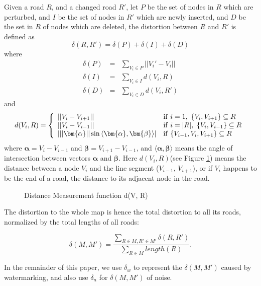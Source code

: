 Given a road $R$, and a changed road $R'$,
let $P$ be the set of nodes in $R$ which are perturbed, and $I$ be the set of
nodes in $R'$ which are newly inserted, and $D$ be the set in $R$ of nodes 
which are deleted, the distortion between $R$ and $R'$ is defined as 
\[\delta(R, R') = \delta(P) + \delta (I) + \delta (D)\]
where
\begin{eqnarray*}
\delta(P) &=& \sum_{V_i \in P} ||V_i' - V_i|| \\ 
\delta(I) &=& \sum_{V_i \in I} d(V_i, R) \\
\delta(D) &=& \sum_{V_i \in D} d(V_i, R')
\end{eqnarray*}
and 
\[
d(V_i, R) = \left\{
\begin{array}{ll}
||V_i - V_{i+1}|| & {\rm if}~ i = 1,~  \{V_i, V_{i+1}\} \subseteq R\\
||V_i - V_{i-1}|| & {\rm if}~ i = |R|,~  \{V_i, V_{i-1}\} \subseteq R\\
|||\bm{\alpha} ||\sin{\langle\bm{\alpha},\bm{\beta}\rangle}| &{\rm if}~ 
				\{V_{i-1}, V_i, V_{i+1}\} \subseteq R
\end{array}
\right. 
\]
where $\bm{\alpha}=V_i - V_{i-1}$ and $\bm{\beta}=V_{i+1}-V_{i-1}$, 
and $\langle\bm{\alpha},\bm{\beta}\rangle$ means the 
angle of intersection between vectors $\bm{\alpha}$ and $\bm{\beta}$. 
Here $d(V_i, R)$(see Figure \ref{fig:dist}) means the distance between a node $V_i$ and the line
segment ($V_{i-1}$, $V_{i+1}$), or if $V_i$ happens to be the end of a road,
the distance to its adjacent node in the road. 

\begin{figure}[h]
\centering
{}
\caption{Distance Measurement function d(V, R)}
\label{fig:dist}
\end{figure}

The distortion to the whole map is hence the total distortion to all its roads,
normalized by the total lengths of all roads:

\[
\label{equ:distort}
\delta(M, M') = \frac{\sum_{R \in M, R' \in M'} \delta(R, R')}{\sum_{R \in M}length(R)}.\] 

In the remainder of this paper, we use $\delta_w$ to represent the $\delta(M, M')$ caused by
watermarking, and also use $\delta_n$ for $\delta(M, M')$ of noise.



